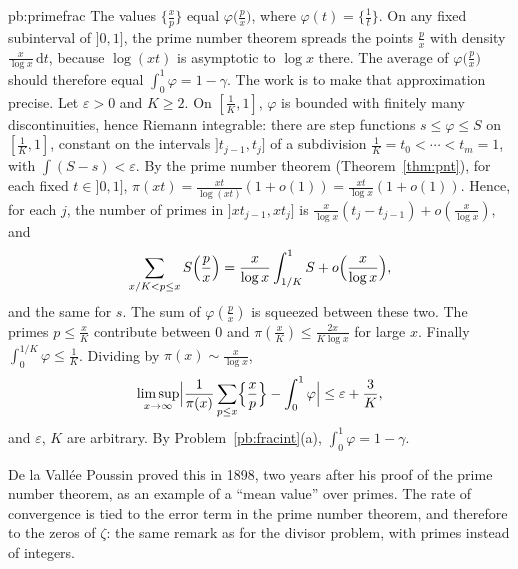 \begin{solution}{pb:primefrac}
\idea The values $\bigl\{\frac xp\bigr\}$ equal $\varphi\bigl(\frac px\bigr)$, where $\varphi(t)=\bigl\{\frac1t\bigr\}$. On any fixed subinterval of $]0,1]$, the prime number theorem spreads the points $\frac px$ with density $\frac x{\log x}\,\mathrm dt$, because $\log(xt)$ is asymptotic to $\log x$ there. The average of $\varphi\bigl(\frac px\bigr)$ should therefore equal $\int_0^1\varphi=1-\gamma$. The work is to make that approximation precise.
\writeup Let $\varepsilon>0$ and $K\ge2$. On $[\frac1K,1]$, $\varphi$ is bounded with finitely many discontinuities, hence Riemann integrable: there
are step functions $s\le\varphi\le S$ on $[\frac1K,1]$, constant on the intervals $]t_{j-1},t_j]$ of a subdivision $\frac1K=t_0<\cdots<t_m=1$, with
$\int(S-s)<\varepsilon$. By the prime number theorem (Theorem~\ref{thm:pnt}), for each fixed $t\in]0,1]$, $\pi(xt)=\frac{xt}{\log(xt)}(1+o(1))=\frac{xt}{\log x}(1+o(1))$.
Hence, for each $j$, the number of primes in $]xt_{j-1},xt_j]$ is $\frac x{\log x}(t_j-t_{j-1})+o(\frac x{\log x})$, and
\[
\sum_{x/K<p\le x}S\Bigl(\frac px\Bigr)=\frac x{\log x}\int_{1/K}^1S+o\Bigl(\frac x{\log x}\Bigr),
\]
and the same for $s$. The sum of $\varphi(\frac px)$ is squeezed between these two. The primes $p\le\frac xK$ contribute between $0$ and
$\pi(\frac xK)\le\frac{2x}{K\log x}$ for large $x$. Finally $\int_0^{1/K}\varphi\le\frac1K$. Dividing by $\pi(x)\sim\frac x{\log x}$,
\[
\limsup_{x\to\infty}\Bigl|\frac1{\pi(x)}\sum_{p\le x}\Bigl\{\frac xp\Bigr\}-\int_0^1\varphi\Bigr|\le\varepsilon+\frac3K,
\]
and $\varepsilon$, $K$ are arbitrary. By Problem~\ref{pb:fracint}(a), $\int_0^1\varphi=1-\gamma$.

\leads De la Vallée Poussin proved this in 1898, two years after his proof of the prime number theorem, as an example of a ``mean
value'' over primes. The rate of convergence is tied to the error term in the prime number theorem, and therefore to the zeros of
$\zeta$: the same remark as for the divisor problem, with primes instead of integers.
\end{solution}

